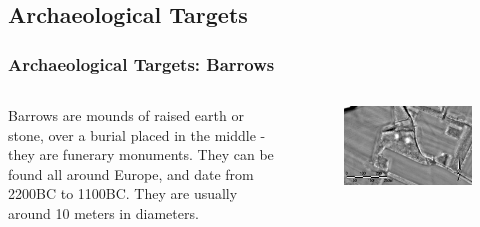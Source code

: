 \documentclass[aspectratio=169]{beamer}
\begin{document}
\subsection{Archaeological Targets}
\begin{frame}
	\frametitle{Archaeological Targets: Barrows}
	\begin{columns}[T] %
		\begin{column}{.48\textwidth}
			Barrows are mounds of raised earth or stone, over a burial placed in the middle - they are funerary monuments. They can be found all around Europe, and date from 2200BC to 1100BC. They are usually around 10 meters in diameters.
		\end{column}%
		\hfill%
		\begin{column}{.48\textwidth}

			\begin{figure}
				\centering
				\includegraphics[width=\textwidth]{barrowsEx}
				\label{}
			\end{figure}
		\end{column}%
	\end{columns}
\end{frame}
\end{document}
